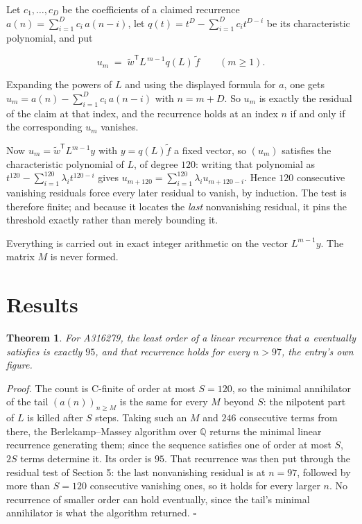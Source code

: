\documentclass[11pt]{article}
\newtheorem{theorem}{Theorem}
\theoremstyle{definition}
\begin{document}
Let $c_1,\dots,c_D$ be the coefficients of a claimed recurrence $a(n) = \sum_{i=1}^{D} c_i\,a(n-i)$, let $q(t) = t^{D} - \sum_{i=1}^{D} c_i t^{D-i}$ be its characteristic polynomial, and put

\[u_m \;=\; \tilde w^{\mathsf T} L^{\,m-1} q(L)\,\tilde f \qquad (m \ge 1).\]

Expanding the powers of $L$ and using the displayed formula for $a$, one gets $u_m = a(n) - \sum_{i=1}^{D} c_i\,a(n-i)$ with $n = m + D$. So $u_m$ is exactly the residual of the claim at that index, and the recurrence holds at an index $n$ if and only if the corresponding $u_m$ vanishes.

Now $u_m = \tilde w^{\mathsf T} L^{m-1} y$ with $y = q(L)\tilde f$ a fixed vector, so $(u_m)$ satisfies the characteristic polynomial of $L$, of degree $120$: writing that polynomial as $t^{120} - \sum_{i=1}^{120} \lambda_i t^{120-i}$ gives $u_{m+120} = \sum_{i=1}^{120} \lambda_i u_{m+120-i}$. Hence $120$ consecutive vanishing residuals force every later residual to vanish, by induction. The test is therefore finite; and because it locates the {\itshape last} nonvanishing residual, it pins the threshold exactly rather than merely bounding it.

Everything is carried out in exact integer arithmetic on the vector $L^{m-1}y$. The matrix $M$ is never formed.

\section{Results}

\begin{theorem} For A316279, the least order of a linear recurrence that $a$ eventually satisfies is exactly $95$, and that recurrence holds for every $n > 97$, the entry's own figure.\end{theorem}

{\itshape Proof.} The count is C-finite of order at most $S = 120$, so the minimal annihilator of the tail $(a(n))_{n \ge M}$ is the same for every $M$ beyond $S$: the nilpotent part of $L$ is killed after $S$ steps. Taking such an $M$ and $246$ consecutive terms from there, the Berlekamp--Massey algorithm over $\mathbb{Q}$ returns the minimal linear recurrence generating them; since the sequence satisfies one of order at most $S$, $2S$ terms determine it. Its order is $95$. That recurrence was then put through the residual test of Section 5: the last nonvanishing residual is at $n = 97$, followed by more than $S = 120$ consecutive vanishing ones, so it holds for every larger $n$. No recurrence of smaller order can hold eventually, since the tail's minimal annihilator is what the algorithm returned. $\square$
\end{document}
